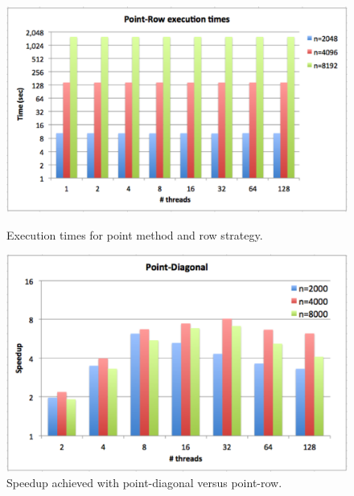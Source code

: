 \documentclass[../thesis]{subfiles}
\begin{document}
	\begin{figure}[p]
		\begin{minipage}[t]{0.48\textwidth}
			\centering
			\includegraphics[width=\textwidth]{assets/images/multicore/point-row.png}
			\caption[Execution times for point-row]{Execution times for point method and row strategy.}
			\label{fig:multicore:point:row:times}
		\end{minipage}
		\hfill
		\begin{minipage}[t]{0.46\textwidth}
			\centering
			\includegraphics[width=\textwidth]{assets/images/multicore/point-diagonal.png}
			\caption[Speedup point-diagonal vs point-row]{Speedup achieved with point-diagonal versus point-row.}
			\label{fig:multicore:point:diagonal:speedup}
		\end{minipage}
	\end{figure}
\end{document}
